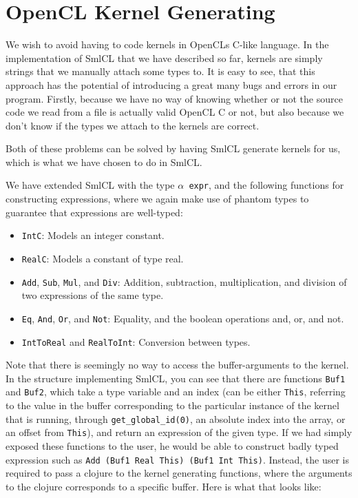 \section{OpenCL Kernel Generating}

We wish to avoid having to code kernels in OpenCLs C-like language. In
the implementation of SmlCL that we have described so far, kernels are
simply strings that we manually attach some types to. It is easy to
see, that this approach has the potential of introducing a great many
bugs and errors in our program. Firstly, because we have no way of
knowing whether or not the source code we read from a file is actually
valid OpenCL C or not, but also because we don't know if the types
we attach to the kernels are correct.

Both of these problems can be solved by having SmlCL generate kernels
for us, which is what we have chosen to do in SmlCL.

We have extended SmlCL with the type \texttt{$\alpha$ expr}, and the
following functions for constructing expressions, where we again make
use of phantom types to guarantee that expressions are well-typed:

\begin{itemize}
  \item \texttt{IntC}: Models an integer constant.
  \item \texttt{RealC}: Models a constant of type real.
  \item \texttt{Add}, \texttt{Sub}, \texttt{Mul}, and \texttt{Div}:
    Addition, subtraction, multiplication, and division of two expressions of the same type.
  \item \texttt{Eq}, \texttt{And}, \texttt{Or}, and \texttt{Not}:
    Equality, and the boolean operations and, or, and not.
  \item \texttt{IntToReal} and \texttt{RealToInt}: Conversion between
    types.
\end{itemize}

Note that there is seemingly no way to access the buffer-arguments to
the kernel. In the structure implementing SmlCL, you can see that
there are functions \texttt{Buf1} and
\texttt{Buf2}, which take a type variable and an index (can be either
\texttt{This}, referring to the value in the buffer corresponding to
the particular instance of the kernel that is running, through
\texttt{get\_global\_id(0)}, an absolute index into the array, or an
offset from \texttt{This}), and return an expression of the given
type. If we had simply exposed these functions to the user, he would
be able to construct badly typed expression such as \texttt{Add (Buf1
  Real This) (Buf1 Int This)}. Instead, the user is required to pass a
clojure to the kernel generating functions, where the arguments to the
clojure corresponds to a specific buffer. Here is what that looks
like:

